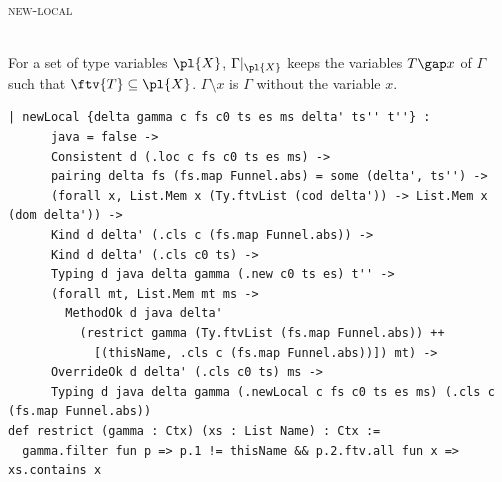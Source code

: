 \begin{cmp}{\textsc{new-local}}
\begin{paperside}
\\[1ex]
For a set of type variables $\pl{X}$, $\Gamma|_{\pl{X}}$ keeps the variables $T\gap x$ of $\Gamma$ such that $\ftv{T}\subseteq\pl{X}$.
$\Gamma\setminus x$ is $\Gamma$ without the variable $x$.
\end{paperside}
\begin{leanside}
\begin{lstlisting}[style=leanside]
  | newLocal {delta gamma c fs c0 ts es ms delta' ts'' t''} :
      java = false ->
      Consistent d (.loc c fs c0 ts es ms) ->
      pairing delta fs (fs.map Funnel.abs) = some (delta', ts'') ->
      (forall x, List.Mem x (Ty.ftvList (cod delta')) -> List.Mem x (dom delta')) ->
      Kind d delta' (.cls c (fs.map Funnel.abs)) ->
      Kind d delta' (.cls c0 ts) ->
      Typing d java delta gamma (.new c0 ts es) t'' ->
      (forall mt, List.Mem mt ms ->
        MethodOk d java delta'
          (restrict gamma (Ty.ftvList (fs.map Funnel.abs)) ++
            [(thisName, .cls c (fs.map Funnel.abs))]) mt) ->
      OverrideOk d delta' (.cls c0 ts) ms ->
      Typing d java delta gamma (.newLocal c fs c0 ts es ms) (.cls c (fs.map Funnel.abs))
def restrict (gamma : Ctx) (xs : List Name) : Ctx :=
  gamma.filter fun p => p.1 != thisName && p.2.ftv.all fun x => xs.contains x
\end{lstlisting}
\end{leanside}
\end{cmp}

